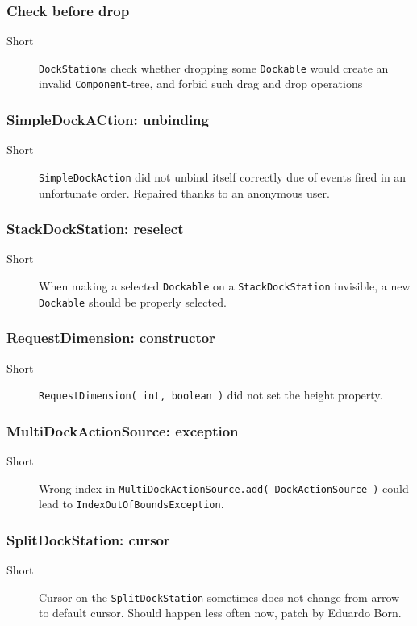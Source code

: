 \documentclass[a4paper,10pt]{article}
\newcommand{\src}[1]{\lstinline[basicstyle=\normalsize\ttfamily,keywordstyle=\normalsize\ttfamily,identifierstyle=\normalsize\ttfamily]|#1|}
\newcommand{\short}{\item[Short]}
\begin{document}
\subsubsection{Check before drop}
\begin{description}
 \short \src{DockStation}s check whether dropping some \src{Dockable} would create an invalid \src{Component}-tree, and forbid such drag and drop operations
 \end{description}

\subsubsection{SimpleDockACtion: unbinding}
\begin{description}
 \short \src{SimpleDockAction} did not unbind itself correctly due of events fired in an unfortunate order. Repaired thanks to an anonymous user.
\end{description}

\subsubsection{StackDockStation: reselect}
\begin{description}
 \short When making a selected \src{Dockable} on a \src{StackDockStation} invisible, a new \src{Dockable} should be properly selected.
\end{description}

\subsubsection{RequestDimension: constructor}
\begin{description}
 \short \src{RequestDimension( int, boolean )} did not set the height property.
\end{description}

\subsubsection{MultiDockActionSource: exception}
\begin{description}
 \short Wrong index in \src{MultiDockActionSource.add( DockActionSource )} could lead to \src{IndexOutOfBoundsException}.
\end{description}

\subsubsection{SplitDockStation: cursor}
\begin{description}
 \short Cursor on the \src{SplitDockStation} sometimes does not change from arrow to default cursor. Should happen less often now, patch by Eduardo Born.
\end{description}
\end{document}
